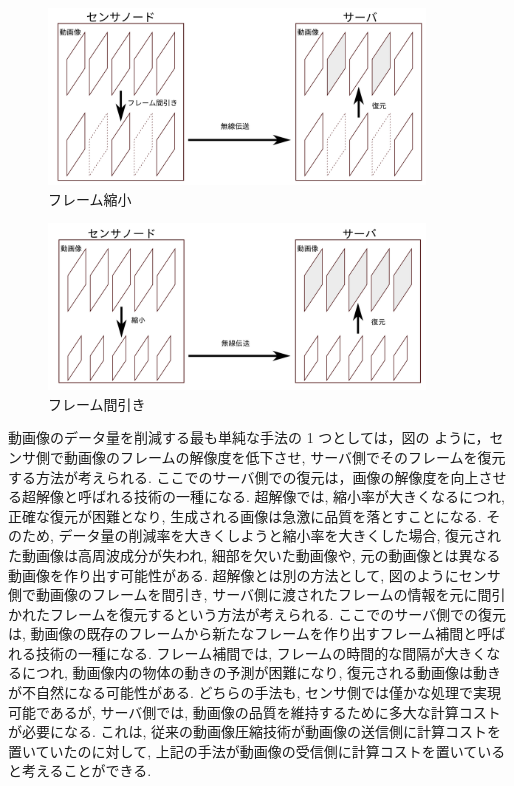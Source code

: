 \documentclass[a4paper,12pt]{jsreport}
\begin{document}
\begin{figure}[h]
  \begin{center}
    \includegraphics[width=10cm]{./frame_reduction.png}
    \caption{フレーム縮小}
    \label{reduction}
  \end{center}
\end{figure}

\begin{figure}[h]
  \begin{center}
    \includegraphics[width=10cm]{./frame_thinning.png}
    \caption{フレーム間引き}
  \end{center}
\end{figure}


動画像のデータ量を削減する最も単純な手法の 1 つとしては，図{}の ように，センサ側で動画像のフレームの解像度を低下させ, サーバ側でそのフレームを復元する方法が考えられる. ここでのサーバ側での復元は，画像の解像度を向上させる超解像と呼ばれる技術の一種になる. 超解像では, 縮小率が大きくなるにつれ, 正確な復元が困難となり, 生成される画像は急激に品質を落とすことになる. そのため, データ量の削減率を大きくしようと縮小率を大きくした場合, 復元された動画像は高周波成分が失われ, 細部を欠いた動画像や, 元の動画像とは異なる動画像を作り出す可能性がある. 超解像とは別の方法として, 図{}のようにセンサ側で動画像のフレームを間引き, サーバ側に渡されたフレームの情報を元に間引かれたフレームを復元するという方法が考えられる. ここでのサーバ側での復元は, 動画像の既存のフレームから新たなフレームを作り出すフレーム補間と呼ばれる技術の一種になる. フレーム補間では, フレームの時間的な間隔が大きくなるにつれ, 動画像内の物体の動きの予測が困難になり, 復元される動画像は動きが不自然になる可能性がある.
どちらの手法も, センサ側では僅かな処理で実現可能であるが, サーバ側では, 動画像の品質を維持するために多大な計算コストが必要になる. これは, 従来の動画像圧縮技術が動画像の送信側に計算コストを置いていたのに対して, 上記の手法が動画像の受信側に計算コストを置いていると考えることができる.
\end{document}
